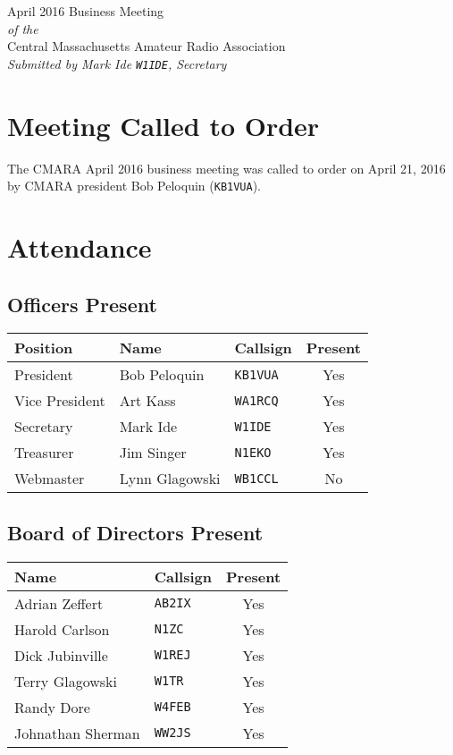 \documentclass[10pt,letterpaper]{article}
\begin{document}
\begin{center}
{\huge April 2016 Business Meeting}\\
\emph{of the}\\
{\Large Central Massachusetts Amateur Radio Association}\\
\emph{Submitted by Mark Ide \texttt{W1IDE}, Secretary}
\end{center}

\section{Meeting Called to Order}
The CMARA April 2016 business meeting was called to order on April 21, 2016 by CMARA president Bob Peloquin (\texttt{KB1VUA}).

\section{Attendance}

\subsection{Officers Present}

\begin{tabular}{|l|l|l|c|}
  \hline
  \textbf{Position} & \textbf{Name}  & \textbf{Callsign} & \textbf{Present} \\ \hline
  President         & Bob Peloquin   & \texttt{KB1VUA}   & Yes \\
  Vice President    & Art Kass       & \texttt{WA1RCQ}   & Yes \\
  Secretary         & Mark Ide       & \texttt{W1IDE}    & Yes \\
  Treasurer         & Jim Singer     & \texttt{N1EKO}    & Yes \\
  Webmaster         & Lynn Glagowski & \texttt{WB1CCL}   & No  \\
  \hline
\end{tabular}

\subsection{Board of Directors Present}

\begin{tabular}{|l|l|c|}
  \hline
  \textbf{Name}     & \textbf{Callsign} & \textbf{Present} \\ \hline
  Adrian Zeffert    & \texttt{AB2IX}    & Yes \\
  Harold Carlson    & \texttt{N1ZC}     & Yes \\
  Dick Jubinville   & \texttt{W1REJ}    & Yes \\
  Terry Glagowski   & \texttt{W1TR}     & Yes \\
  Randy Dore        & \texttt{W4FEB}    & Yes \\
  Johnathan Sherman & \texttt{WW2JS}    & Yes \\
  \hline
\end{tabular}
\end{document}
